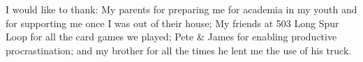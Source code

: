 I would like to thank: My parents for preparing me for academia in my youth and
for supporting me once I was out of their house; My friends at 503 Long Spur
Loop for all the card games we played; Pete & James for enabling productive
procrastination; and my brother for all the times he lent
me the use of his truck.
